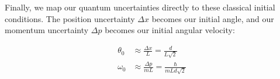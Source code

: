   Finally, we map our quantum uncertainties directly to these
  classical initial conditions. The position uncertainty $\Delta x$
  becomes our initial angle, and our momentum uncertainty $\Delta p$
  becomes our initial angular velocity:

  \begin{equation}
    \begin{split}
      \theta_0 &\approx \frac{\Delta x}{L} = \frac{d}{L\sqrt{2}} \\
      \omega_0 &\approx \frac{\Delta p}{mL} = \frac{\hbar}{mLd\sqrt{2}}
    \end{split}
  \end{equation}    
